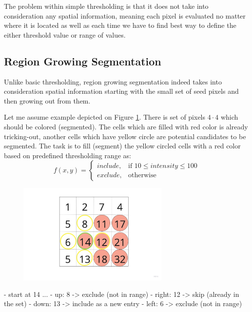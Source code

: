 The problem within simple thresholding is that it does not take into consideration any spatial information, meaning each pixel is evaluated no matter where it is located as well as each time we have to find best way to define the either threshold value or range of values.    


\subsection{Region Growing Segmentation}
Unlike basic thresholding, region growing segmentation indeed takes into consideration spatial information starting with the small set of seed pixels and then growing out from them. 

Let me assume example depicted on Figure \ref{fig:grow_region}. There is set of pixels $4 \cdot 4$ which should be colored (segmented). The cells which are filled with red color is already tricking-out, another cells which have yellow circle are potential candidates to be segmented. The task is to fill (segment) the yellow circled cells with a red color based on predefined thresholding range as: 
\[
    f(x, y) = 
\begin{cases}
    include ,& \text{if } 10 \leq intensity \leq 100 \\
    exclude ,& \text{otherwise}
\end{cases}
\]

\begin{minipage}{0.5\textwidth}
\begin{figure}[H]
\includegraphics[width=7.5cm]{images/growing-region-thresholding.jpeg}
\caption{\label{fig:grow_region}}
\end{figure}
\end{minipage} \hfill
\begin{minipage}{0.45\textwidth}
- start at 14 ... \newline
- up: 8 -> exclude (not in range) \newline
- right: 12 -> skip (already in the set) \newline
- down: 13 -> include as a new entry \newline
- left: 6 -> exclude (not in range) \newline
\end{minipage}

